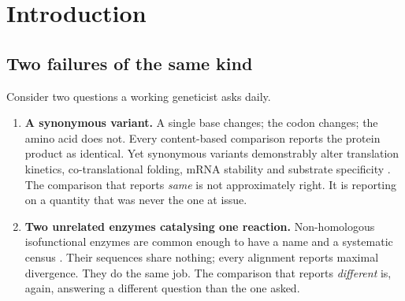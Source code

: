 \documentclass[11pt,twocolumn,a4paper]{article}
\theoremstyle{plain}
\theoremstyle{definition}
\theoremstyle{remark}
\begin{document}
\begin{abstract}
We give the full grammar, a typing judgement, a small-step operational
semantics, and worked programs reproducing three families of genomic
experiment --- matched-filter motif detection, spectral homology search
over a database, and four-column functional adjudication --- in a single
language whose output is a report bearing certificates rather than a
number. We report honestly that one assumption the four-column verdict
requires, the independence of the verdict from the choice of admissible
response, \emph{fails} on solved biochemical networks: only $28.6\%$ of
comparisons fall within threshold, with a maximum discrepancy of $0.307$
against $\theta=0.01$. Synopsis makes this failure syntactically
visible: the response operator requires its map to be named, so no
program can conceal which arbitrary choice it made. We regard designing
a language that cannot hide its open problems as the point.
\end{abstract}

\tableofcontents

\clearpage

\section{Introduction}
\label{sec:intro}

\subsection{Two failures of the same kind}

Consider two questions a working geneticist asks daily.

\begin{enumerate}[label=(\roman*),leftmargin=2.2em]
\item \textbf{A synonymous variant.} A single base changes; the codon
      changes; the amino acid does not. Every content-based comparison
      reports the protein product as identical. Yet synonymous variants
      demonstrably alter translation kinetics, co-translational folding,
      mRNA stability and substrate specificity
      \cite{plotkin2011synonymous,sauna2011silent,kimchi2007silent}. The
      comparison that reports \emph{same} is not approximately right. It
      is reporting on a quantity that was never the one at issue.

\item \textbf{Two unrelated enzymes catalysing one reaction.} Non-homologous
      isofunctional enzymes are common enough to have a name and a
      systematic census \cite{omelchenko2010nonhomologous,galperin2010divergence}.
      Their sequences share nothing; every alignment reports maximal
      divergence. They do the same job. The comparison that reports
      \emph{different} is, again, answering a different question than
      the one asked.
\end{enumerate}
\end{document}
